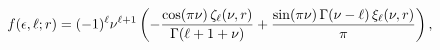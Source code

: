 \[\mathop{f\/}\nolimits\!\left(\epsilon,\ell;r\right)=(-1)^{\ell}\nu^{\ell+1}%
\left(-\frac{\mathop{\cos\/}\nolimits\!\left(\pi\nu\right)\zeta_{\ell}(\nu,r)}%
{\mathop{\Gamma\/}\nolimits\!\left(\ell+1+\nu\right)}+\frac{\mathop{\sin\/}%
\nolimits\!\left(\pi\nu\right)\mathop{\Gamma\/}\nolimits\!\left(\nu-\ell\right%
)\xi_{\ell}(\nu,r)}{\pi}\right),\]